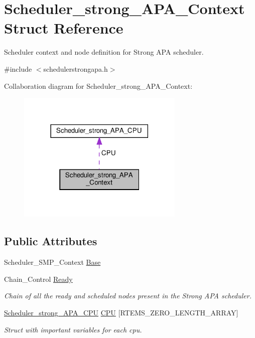 \hypertarget{structScheduler__strong__APA__Context}{}\section{Scheduler\+\_\+strong\+\_\+\+A\+P\+A\+\_\+\+Context Struct Reference}
\label{structScheduler__strong__APA__Context}


Scheduler context and node definition for Strong A\+PA scheduler.  




{\ttfamily \#include $<$schedulerstrongapa.\+h$>$}



Collaboration diagram for Scheduler\+\_\+strong\+\_\+\+A\+P\+A\+\_\+\+Context\+:
\nopagebreak
\begin{figure}[H]
\begin{center}
\leavevmode
\includegraphics[width=225pt]{structScheduler__strong__APA__Context__coll__graph}
\end{center}
\end{figure}
\subsection*{Public Attributes}
\begin{DoxyCompactItemize}
\item 
Scheduler\+\_\+\+S\+M\+P\+\_\+\+Context \hyperlink{structScheduler__strong__APA__Context_a55755b445b7e7beaf1b87b178521e615}{Base}
\item 
Chain\+\_\+\+Control \hyperlink{structScheduler__strong__APA__Context_a0c445c35a07b8aa14f9d76c6dfb4916c}{Ready}
\begin{DoxyCompactList}\small\item\em Chain of all the ready and scheduled nodes present in the Strong A\+PA scheduler. \end{DoxyCompactList}\item 
\hyperlink{structScheduler__strong__APA__CPU}{Scheduler\+\_\+strong\+\_\+\+A\+P\+A\+\_\+\+C\+PU} \hyperlink{structScheduler__strong__APA__Context_afdc7dcc1fef07a07130a8ddde0895e9c}{C\+PU} \mbox{[}R\+T\+E\+M\+S\+\_\+\+Z\+E\+R\+O\+\_\+\+L\+E\+N\+G\+T\+H\+\_\+\+A\+R\+R\+AY\mbox{]}
\begin{DoxyCompactList}\small\item\em Struct with important variables for each cpu. \end{DoxyCompactList}\end{DoxyCompactItemize}


